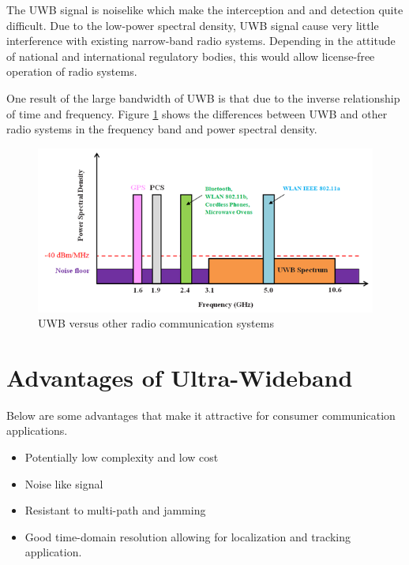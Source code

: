 \documentclass[\main/main.tex]{subfiles}
\begin{document}
The UWB signal is noiselike which make the interception and and detection quite difficult. Due to the low-power spectral density, UWB signal cause very little interference with existing narrow-band radio systems. Depending in the attitude of national and international regulatory bodies, this would allow license-free operation of radio systems.

One result of the large bandwidth of UWB is that due to the inverse relationship of
time and frequency. Figure \ref{fig:uwb_versus_other_radio_communication_systems} shows the differences between UWB and other radio systems in the frequency band and power spectral density.

\begin{figure}[H]
    \centering
    \includegraphics[width=1\textwidth]{uwb_versus_other_radio_communication_systems.png}
    \caption{UWB versus other radio communication systems}
    \label{fig:uwb_versus_other_radio_communication_systems}
\end{figure}

\section{Advantages of Ultra-Wideband}

Below \cite{uwb_theory_and_applications} are some advantages that make it attractive for consumer communication applications.
\begin{itemize}
    \item Potentially low complexity and low cost
    \item Noise like signal
    \item Resistant to multi-path and jamming
    \item Good time-domain resolution allowing for localization and tracking application.
\end{itemize}
\end{document}
